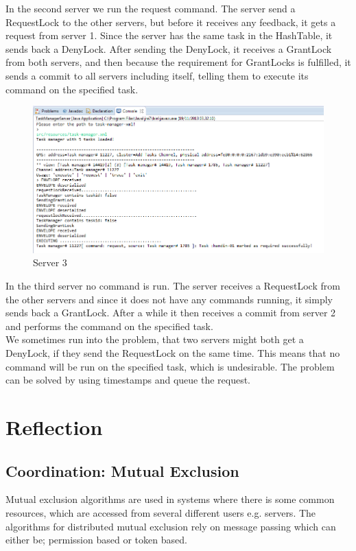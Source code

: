 In the second server we run the request command. The server send a RequestLock to the other servers, but before it receives any feedback, it gets a request from server 1. Since the server has the same task in the HashTable, it sends back a DenyLock. After sending the DenyLock, it receives a GrantLock from both servers, and then because the requirement for GrantLocks is fulfilled, it sends a commit to all servers including itself, telling them to execute its command on the specified task. \\

\begin{figure}[H]
\caption{Server 3}
\includegraphics[scale=0.6]{images/CCServer3.png}
\end{figure}
\vspace{10pt}

In the third server no command is run. The server receives a RequestLock from the other servers and since it does not have any commands running, it simply sends back a GrantLock. After a while it then receives a commit from server 2 and performs the command on the specified task. \\

We sometimes run into the problem, that two servers might both get a DenyLock, if they send the RequestLock on the same time. This means that no command will be run on the specified task, which is undesirable. The problem can be solved by using timestamps and queue the request.

\section{Reflection}
\label{MutualExclusion_motivation}



\subsection{Coordination: Mutual Exclusion}
Mutual exclusion algorithms are used in systems where there is some common resources, which are accessed from several different users e.g. servers. The algorithms for distributed mutual exclusion rely on message passing which can either be; permission based or token based. \\

